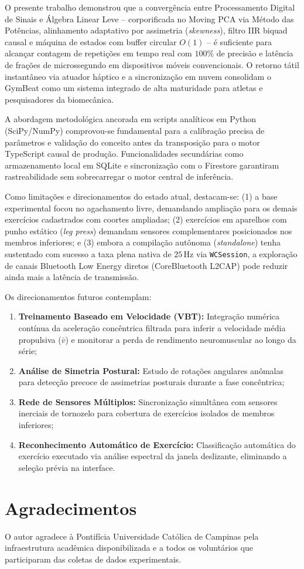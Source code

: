 \documentclass[12pt]{article}
\begin{document}
O presente trabalho demonstrou que a convergência entre Processamento Digital de Sinais e Álgebra Linear Leve -- corporificada no Moving PCA via Método das Potências, alinhamento adaptativo por assimetria (\textit{skewness}), filtro IIR biquad causal e máquina de estados com buffer circular $O(1)$ -- é suficiente para alcançar contagem de repetições em tempo real com $100\%$ de precisão e latência de frações de microssegundo em dispositivos móveis convencionais. O retorno tátil instantâneo via atuador háptico e a sincronização em nuvem consolidam o GymBeat como um sistema integrado de alta maturidade para atletas e pesquisadores da biomecânica.

A abordagem metodológica ancorada em scripts analíticos em Python (SciPy/NumPy) comprovou-se fundamental para a calibração precisa de parâmetros e validação do conceito antes da transposição para o motor TypeScript causal de produção. Funcionalidades secundárias como armazenamento local em SQLite e sincronização com o Firestore garantiram rastreabilidade sem sobrecarregar o motor central de inferência.

Como limitações e direcionamentos do estado atual, destacam-se: (1) a base experimental focou no agachamento livre, demandando ampliação para os demais exercícios cadastrados com coortes ampliadas; (2) exercícios em aparelhos com punho estático (\textit{leg press}) demandam sensores complementares posicionados nos membros inferiores; e (3) embora a compilação autônoma (\textit{standalone}) tenha sustentado com sucesso a taxa plena nativa de $25\,\text{Hz}$ via \texttt{WCSession}, a exploração de canais Bluetooth Low Energy diretos (CoreBluetooth L2CAP) pode reduzir ainda mais a latência de transmissão.

Os direcionamentos futuros contemplam:
\begin{enumerate}
    \item \textbf{Treinamento Baseado em Velocidade (VBT):} Integração numérica contínua da aceleração concêntrica filtrada para inferir a velocidade média propulsiva ($\bar{v}$) e monitorar a perda de rendimento neuromuscular ao longo da série;
    \item \textbf{Análise de Simetria Postural:} Estudo de rotações angulares anômalas para detecção precoce de assimetrias posturais durante a fase concêntrica;
    \item \textbf{Rede de Sensores Múltiplos:} Sincronização simultânea com sensores inerciais de tornozelo para cobertura de exercícios isolados de membros inferiores;
    \item \textbf{Reconhecimento Automático de Exercício:} Classificação automática do exercício executado via análise espectral da janela deslizante, eliminando a seleção prévia na interface.
\end{enumerate}

\section*{Agradecimentos}

O autor agradece à Pontifícia Universidade Católica de Campinas pela infraestrutura acadêmica disponibilizada e a todos os voluntários que participaram das coletas de dados experimentais.



\end{document}
